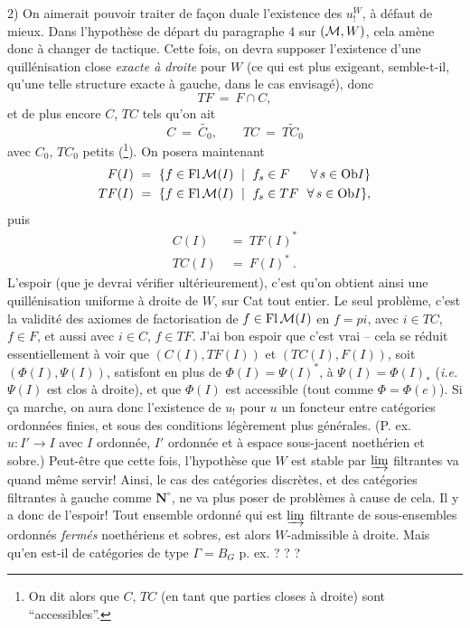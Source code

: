 2) On aimerait pouvoir traiter de façon duale l'existence des $u_!^W$, à défaut de mieux. Dans l'hypothèse de départ du paragraphe 4 sur $(\mathcal{M},W)$, cela amène donc à changer de tactique. Cette fois, on devra supposer l'existence d'une quillénisation close \textit{exacte à droite} pour $W$ (ce qui est plus exigeant, semble-t-il, qu'une telle structure exacte à gauche, dans le cas envisagé), donc
\[
TF \ = \ F \cap C,
\]
et de plus encore $C$, $TC$ tels qu'on ait
\[
C \ = \ \widetilde{C_0}, \qquad TC \ = \ \widetilde{TC_0}
\]
avec $C_0$, $TC_0$ petits (\footnote[38]{On dit alors que $C$, $TC$ (en tant que parties closes à droite) sont “accessibles”.}). On posera maintenant
\[
\begin{aligned}
F(I) \ &= \ \{f \in \mathrm{Fl}\, \mathcal{M}(I) \ \mid \ f_s \in F \quad\ \ \forall\, s \in \mathrm{Ob} I\}\\
TF(I) \ &= \ \{f \in \mathrm{Fl}\, \mathcal{M}(I) \ \mid \ f_s \in TF \ \ \forall\, s \in \mathrm{Ob} I\},
\end{aligned}
\]
puis
\[
\begin{aligned}
C(I) \ &= \ TF(I)^*\\
TC(I) \ &= \ F(I)^*\ .
\end{aligned}
\]
L'espoir (que je devrai vérifier ultérieurement), c'est qu'on obtient ainsi une quillénisation uniforme à droite de $W$, sur Cat tout entier. Le seul problème, c'est la validité des axiomes de factorisation de $f \in \mathrm{Fl}\, \mathcal{M}(I)$ en $f = pi$, avec $i \in TC$, $f \in F$, et aussi avec $i \in C$, $f \in TF$. %
J'ai bon espoir que c'est vrai -- cela se réduit essentiellement à voir que $(C(I),TF(I))$ et $(TC(I),F(I))$, soit $(\Phi(I),\Psi(I))$, satisfont en plus de $\Phi(I) = \Psi(I)^*$, à $\Psi(I) = \Phi(I)_*$ (\textit{i.e.} $\Psi(I)$ est clos à droite), et que $\Phi(I)$ est accessible (tout comme $\Phi = \Phi(e)$). Si ça marche, on aura donc l'existence
de $u_!$ pour $u$ un foncteur entre catégories ordonnées finies, et sous des conditions légèrement plus générales. (P. ex. $u : I' \longrightarrow I$ avec $I$ ordonnée, $I'$ ordonnée et à espace sous-jacent noethérien et sobre.) Peut-être que cette fois, l'hypothèse que $W$ est stable par $\varinjlim$ filtrantes va quand même servir! Ainsi, le cas des catégories discrètes, et des catégories filtrantes à gauche comme $\mathbf{N}^\circ$, ne va plus poser de problèmes à cause de cela. Il y a donc de l'espoir! Tout ensemble ordonné qui est $\varinjlim$ filtrante de sous-ensembles ordonnés \textit{fermés} noethériens et sobres, est alors $W$-admissible à droite. Mais qu'en est-il de catégories de type $\Gamma = B_G$ p. ex. ? ? ?

